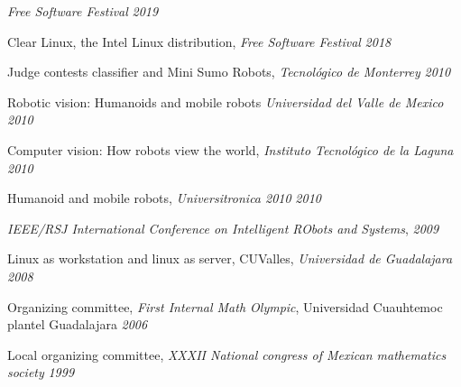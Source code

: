 \begin{loneinnerlist}
	\emph{Free Software Festival} \hfill{\emph{2019}}
  \item Clear Linux, the Intel Linux distribution,
	\emph{Free Software Festival} \hfill{\emph{2018}}
  \item Judge contests classifier and Mini Sumo Robots,
        \emph{Tecnológico de Monterrey} \hfill{\emph{2010}}
  \item Robotic vision: Humanoids and mobile robots \emph{Universidad del
        Valle de Mexico} \hfill{\emph{2010}}
  \item Computer vision: How robots view the world,
        \emph{Instituto Tecnológico de la Laguna} \hfill{\emph{2010}}
  \item Humanoid and mobile robots, \emph{Universitronica 2010}
        \hfill{\emph{2010}}
  \item \emph{IEEE/RSJ International Conference on Intelligent RObots
        and Systems}, \hfill{\emph{2009}}
  \item Linux as workstation and linux as server, CUValles,
        \emph{Universidad de Guadalajara} \hfill{\emph{2008}}
  \item Organizing committee, \emph{First Internal Math Olympic},
        Universidad Cuauh\-temoc plantel Guadalajara \hfill{\emph{2006}}
  \item Local organizing committee, \emph{XXXII National congress of
        Mexican mathematics society} \hfill{\emph{1999}}
\end{loneinnerlist}
